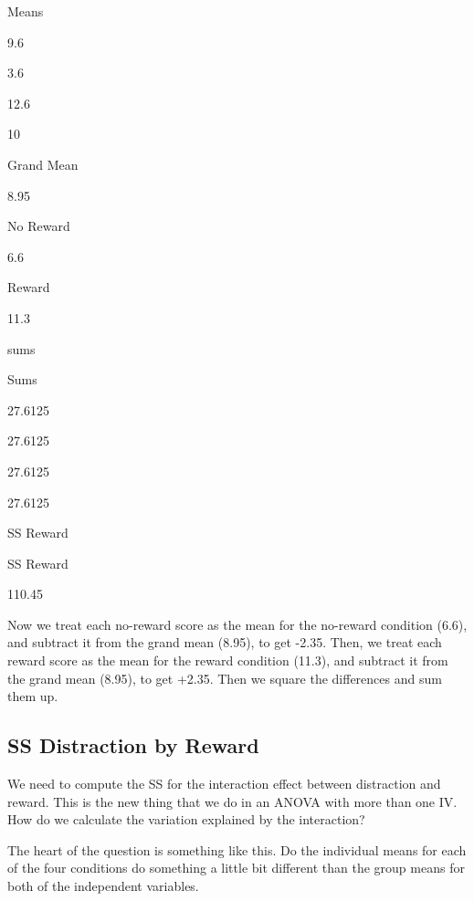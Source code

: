 \documentclass[]{book}
\begin{document}
Means

9.6

3.6

12.6

10

Grand Mean

8.95

No Reward

6.6

Reward

11.3

sums

Sums

27.6125

27.6125

27.6125

27.6125

SS Reward

SS Reward

110.45

Now we treat each no-reward score as the mean for the no-reward condition (6.6), and subtract it from the grand mean (8.95), to get -2.35. Then, we treat each reward score as the mean for the reward condition (11.3), and subtract it from the grand mean (8.95), to get +2.35. Then we square the differences and sum them up.

\hypertarget{ss-distraction-by-reward}{%
\subsection{SS Distraction by Reward}\label{ss-distraction-by-reward}}

We need to compute the SS for the interaction effect between distraction and reward. This is the new thing that we do in an ANOVA with more than one IV. How do we calculate the variation explained by the interaction?

The heart of the question is something like this. Do the individual means for each of the four conditions do something a little bit different than the group means for both of the independent variables.
\end{document}
